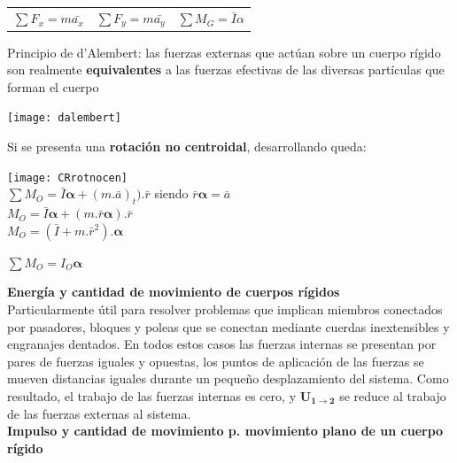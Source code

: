 \documentclass[11pt,a4paper,twocolumn]{article}
\newcommand{\vcs}[1]{\boldsymbol{#1}}
\begin{document}
	\begin{tcolorbox}
		\begin{center}
			\begin{tabular}{c c c}
				$\sum F_{x}=m\bar{a_{x}} $&$\sum F_{y}=m\bar{a_{y}} $ & $\sum M_{G}=\bar{I}\alpha$\\
			\end{tabular}
		\end{center}
	\end{tcolorbox}
	Principio de d'Alembert: las fuerzas externas que actúan sobre un cuerpo rígido son realmente \textbf{equivalentes} a las fuerzas efectivas de las diversas partículas que forman el cuerpo
	\begin{center}
		\texttt{[image: dalembert]}
	\end{center}
	Si se presenta una \textbf{rotación no centroidal}, desarrollando queda:
	\begin{center}
		\texttt{[image: CRrotnocen]}\\
		$ \sum M_{O}=\bar{I}\vcs{\alpha}+(m.\bar{a})_{t}).\bar{r}$ siendo $ \bar{r}\vcs{\alpha}=\bar{a}$\\
		$M_{O}=\bar{I}\vcs{\alpha}+(m.\bar{r}\vcs{\alpha}).\bar{r}$\\
		$M_{O}=(\bar{I}+m.\bar{r}^{2}).\vcs{\alpha}$
		\begin{tcolorbox}
			\begin{center}
				$\sum M_{O}=I_{O}\vcs{\alpha}$
			\end{center}
		\end{tcolorbox}
	\end{center}
\textbf{Energía y cantidad de movimiento de cuerpos rígidos}\\
Particularmente útil para resolver problemas que implican miembros conectados por pasadores, bloques y poleas que se conectan mediante cuerdas inextensibles y engranajes dentados. En todos estos casos las fuerzas internas se presentan por pares de fuerzas iguales y opuestas, los puntos de aplicación de las fuerzas se mueven distancias iguales durante un pequeño desplazamiento del sistema. Como resultado, el trabajo de las fuerzas internas es cero, y $\vcs{U_{1\rightarrow2}}$ se reduce al trabajo de las fuerzas externas al sistema.\\


\textbf{Impulso y cantidad de movimiento p. movimiento plano de un cuerpo rígido}\\
\end{document}
